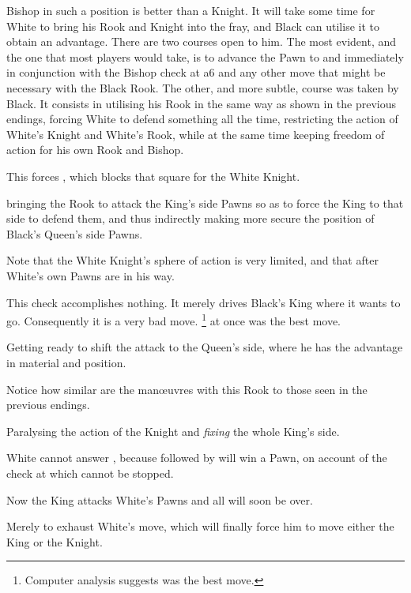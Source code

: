 \documentclass[11pt,a4paper]{book}
\begin{document}
Bishop in such a position is better than a Knight. It will take some time for White to bring his Rook and Knight into the fray, and Black can utilise it to obtain an advantage. There are two courses open to him. The most evident, and the one that most players would take, is to advance the Pawn to  and  immediately in conjunction with the Bishop check at a6 and any other move that might be necessary with the Black Rook. The other, and more subtle, course was taken by Black. It consists in utilising his Rook in the same way as shown in the previous endings, forcing White to defend something all the time, restricting the action of White's Knight and White's Rook, while at the same time keeping freedom of action for his own Rook and Bishop.

 This forces , which blocks that square for the White Knight.

 bringing the Rook to attack the King's side Pawns so as to force the King to that side to defend them, and thus indirectly making more secure the position of Black's Queen's side Pawns.

 Note that the White Knight's sphere of action is very limited, and that after  White's own Pawns are in his way.

 This check accomplishes nothing. It merely drives Black's King where it wants to go. Consequently it is a very bad move. \footnote{Computer analysis suggests  was the best move.} at once was the best move.

 Getting ready to shift the attack to the Queen's side, where he has the advantage in material and position.

 Notice how similar are the manœuvres with this Rook to those seen in the previous endings.

 Paralysing the action of the Knight and \emph{fixing} the whole King's side.

 White cannot answer , because  followed by  will win a Pawn, on account of the check at  which cannot be stopped.

 Now the King attacks White's Pawns and all will soon be over.

 Merely to exhaust White's move, which will finally force him to move either the King or the Knight.
\end{document}
